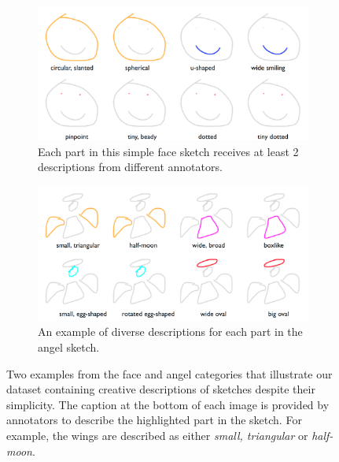 \begin{figure}[!h]
\begin{subfigure}{\textwidth}
\centering
\includegraphics[width=\linewidth]{data_collection/summary/smileyface_descriptions.png}  
\caption{Each part in this simple face sketch receives at least 2 descriptions from different annotators.}
\label{datasummary.face.varied_language}
\end{subfigure}
\newline
\begin{subfigure}{\textwidth}
\centering
\includegraphics[width=\linewidth]{data_collection/summary/angel_descriptions.png}  
\caption{An example of diverse descriptions for each part in the angel sketch.}
\label{datasummary.angel.varied_language}
\end{subfigure}
\caption{Two examples from the face and angel categories that illustrate our dataset containing creative descriptions of sketches despite their simplicity. The caption at the bottom of each image is provided by annotators to describe the highlighted part in the sketch. For example, the wings are described as either \textit{small, triangular} or \textit{half-moon}.}
\label{datasummary.face_angel.varied_language}
\end{figure}

